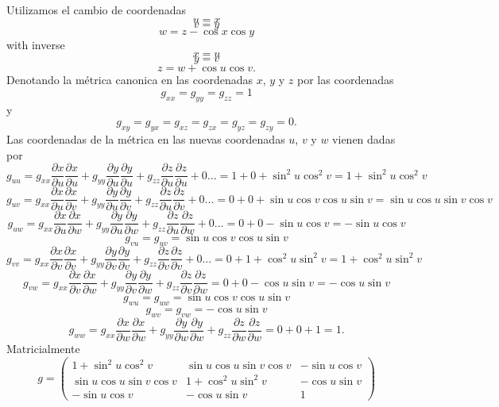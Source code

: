 \documentclass[11pt,spanish]{article}
\begin{document}
Utilizamos el cambio de coordenadas
$$
u = x
$$
$$
v = y
$$
$$
w = z - \cos x\cos y
$$
with inverse
$$
x = u
$$
$$
y = v
$$
$$
z = w + \cos u\cos v
.
$$
Denotando la m\'etrica canonica en las coordenadas $x$, $y$ y $z$ por las coordenadas
$$
g_{xx} = g_{yy} = g_{zz} = 1
$$
y
$$
g_{xy} = g_{yx} = g_{xz} = g_{zx} = g_{yz} = g_{zy} = 0
.
$$
Las coordenadas de la m\'etrica en las nuevas coordenadas $u$, $v$ y $w$ vienen dadas por
$$
g_{uu}
=
g_{xx}
\frac{\partial x}{\partial u}
\frac{\partial x}{\partial u}
+
g_{yy}
\frac{\partial y}{\partial u}
\frac{\partial y}{\partial u}
+
g_{zz}
\frac{\partial z}{\partial u}
\frac{\partial z}{\partial u}
+
0
...
=
1
+
0
+
\sin^2 u\cos^2 v
=
1
+
\sin^2 u\cos^2 v
$$
$$
g_{uv}
=
g_{xx}
\frac{\partial x}{\partial u}
\frac{\partial x}{\partial v}
+
g_{yy}
\frac{\partial y}{\partial u}
\frac{\partial y}{\partial v}
+
g_{zz}
\frac{\partial z}{\partial u}
\frac{\partial z}{\partial v}
+
0
...
=
0
+
0
+
\sin u\cos v
\cos u\sin v
=
\sin u\cos u
\sin v\cos v
$$
$$
g_{uw}
=
g_{xx}
\frac{\partial x}{\partial u}
\frac{\partial x}{\partial w}
+
g_{yy}
\frac{\partial y}{\partial u}
\frac{\partial y}{\partial w}
+
g_{zz}
\frac{\partial z}{\partial u}
\frac{\partial z}{\partial w}
+
0
...
=
0
+
0
-
\sin u\cos v
=
-
\sin u\cos v
$$
$$
g_{vu}
=
g_{uv}
=
\sin u\cos v
\cos u\sin v
$$
$$
g_{vv}
=
g_{xx}
\frac{\partial x}{\partial v}
\frac{\partial x}{\partial v}
+
g_{yy}
\frac{\partial y}{\partial v}
\frac{\partial y}{\partial v}
+
g_{zz}
\frac{\partial z}{\partial v}
\frac{\partial z}{\partial v}
+
0
...
=
0
+
1
+
\cos^2 u\sin^2 v
=
1
+
\cos^2 u\sin^2 v
$$
$$
g_{vw}
=
g_{xx}
\frac{\partial x}{\partial v}
\frac{\partial x}{\partial w}
+
g_{yy}
\frac{\partial y}{\partial v}
\frac{\partial y}{\partial w}
+
g_{zz}
\frac{\partial z}{\partial v}
\frac{\partial z}{\partial w}
=
0
+
0
-
\cos u\sin v
=
-
\cos u\sin v
$$
$$
g_{wu} 
=
g_{uw}
=
\sin u\cos v\cos u\sin v
$$
$$
g_{wv}
=
g_{vw}
=
-\cos u\sin v
$$
$$
g_{ww}
=
g_{xx}
\frac{\partial x}{\partial w}
\frac{\partial x}{\partial w}
+
g_{yy}
\frac{\partial y}{\partial w}
\frac{\partial y}{\partial w}
+
g_{zz}
\frac{\partial z}{\partial w}
\frac{\partial z}{\partial w}
=
0
+
0
+
1
=
1
.
$$
Matricialmente
$$
\boxed{
g =
\begin{pmatrix}
1 + \sin^2 u \cos^2 v & \sin u \cos u \sin v \cos v & -\sin u\cos v\\
\sin u \cos u \sin v \cos v & 1 + \cos^2 u \sin^2 v & -\cos u\sin v \\
-\sin u\cos v & -\cos u\sin v & 1
\end{pmatrix}
}
$$
\end{document}
